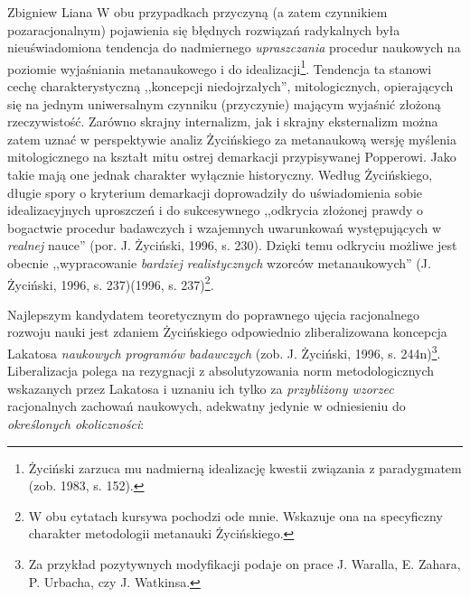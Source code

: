 \begin{artplenv}{Zbigniew Liana}
W obu przypadkach przyczyną (a zatem czynnikiem pozaracjonalnym) pojawienia się błędnych rozwiązań radykalnych była
nieuświadomiona tendencja do nadmiernego \textit{upraszczania} procedur naukowych na poziomie wyjaśniania metanaukowego i
do idealizacji\footnote{Życiński zarzuca mu nadmierną idealizację kwestii związania z paradygmatem
	\label{ref:RNDIrA1jDg11P}(zob. 1983, s. 152).}. Tendencja ta stanowi cechę charakterystyczną ,,koncepcji niedojrzałych'',
mitologicznych, opierających się na jednym uniwersalnym czynniku (przyczynie) mającym wyjaśnić złożoną rzeczywistość.
Zarówno skrajny internalizm, jak i skrajny eksternalizm można zatem uznać w perspektywie analiz Życińskiego za
metanaukową wersję myślenia mitologicznego na kształt mitu ostrej demarkacji przypisywanej Popperowi. Jako takie mają
one jednak charakter wyłącznie historyczny. Według Życińskiego, długie spory o kryterium demarkacji doprowadziły do
uświadomienia sobie idealizacyjnych uproszczeń i do sukcesywnego ,,odkrycia złożonej prawdy o bogactwie procedur
badawczych i wzajemnych uwarunkowań występujących w \textit{realnej} nauce'' \label{ref:RNDT7FuhQK2nh}(por. J. Życiński,
1996, s. 230). Dzięki temu odkryciu możliwe jest obecnie ,,wypracowanie \textit{bardziej realistycznych} wzorców
metanaukowych'' \label{ref:RND3dNAmoO0qC}(J. Życiński, 1996, s. 237)(1996, s. 237)\footnote{W obu cytatach kursywa
	pochodzi ode mnie. Wskazuje ona na specyficzny charakter metodologii metanauki Życińskiego.}.

Najlepszym kandydatem teoretycznym do poprawnego ujęcia racjonalnego rozwoju nauki jest zdaniem Życińskiego odpowiednio
zliberalizowana koncepcja Lakatosa \textit{naukowych programów badawczych} \label{ref:RNDR4AQgoKDGC}(zob. J. Życiński,
1996, s. 244n)\footnote{Za przykład pozytywnych modyfikacji podaje on prace J. Waralla, E. Zahara, P. Urbacha, czy J.
	Watkinsa.}. Liberalizacja polega na rezygnacji z absolutyzowania norm metodologicznych wskazanych przez Lakatosa i
uznaniu ich tylko za \textit{przybliżony wzorzec} racjonalnych zachowań naukowych, adekwatny jedynie w odniesieniu do
\textit{określonych okoliczności}:


\end{artplenv}
